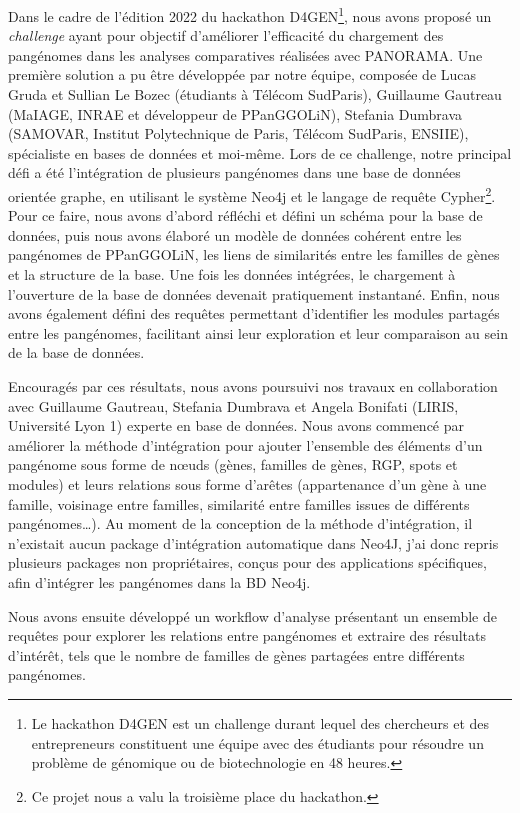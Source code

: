 Dans le cadre de l’édition 2022 du hackathon D4GEN\footnote{Le hackathon D4GEN est un challenge durant lequel des chercheurs et des entrepreneurs constituent une équipe avec des étudiants pour résoudre un problème de génomique ou de biotechnologie en 48 heures.}, nous avons proposé un \textit{challenge} ayant pour objectif d’améliorer l’efficacité du chargement des pangénomes dans les analyses comparatives réalisées avec PANORAMA. Une première solution a pu être développée par notre équipe, composée de Lucas Gruda et Sullian Le Bozec (étudiants à Télécom SudParis), Guillaume Gautreau (MaIAGE, INRAE et développeur de PPanGGOLiN), Stefania Dumbrava (SAMOVAR, Institut Polytechnique de Paris, Télécom SudParis, ENSIIE), spécialiste en bases de données et moi-même. Lors de ce challenge, notre principal défi a été l’intégration de plusieurs pangénomes dans une base de données orientée graphe, en utilisant le système Neo4j et le langage de requête Cypher\footnote{Ce projet nous a valu la troisième place du hackathon.}. Pour ce faire, nous avons d’abord réfléchi et défini un schéma pour la base de données, puis nous avons élaboré un modèle de données cohérent entre les pangénomes de PPanGGOLiN, les liens de similarités entre les familles de gènes et la structure de la base. Une fois les données intégrées, le chargement à l’ouverture de la base de données devenait pratiquement instantané. Enfin, nous avons également défini des requêtes permettant d’identifier les modules partagés entre les pangénomes, facilitant ainsi leur exploration et leur comparaison au sein de la base de données.

Encouragés par ces résultats, nous avons poursuivi nos travaux en collaboration avec Guillaume Gautreau, Stefania Dumbrava et Angela Bonifati (LIRIS, Université Lyon 1) experte en base de données. Nous avons commencé par améliorer la méthode d’intégration pour ajouter l’ensemble des éléments d’un pangénome sous forme de n\oe uds (gènes, familles de gènes, RGP, spots et modules) et leurs relations sous forme d’arêtes (appartenance d’un gène à une famille, voisinage entre familles, similarité entre familles issues de différents pangénomes\dots). Au moment de la conception de la méthode d'intégration, il n'existait aucun package d'intégration automatique dans Neo4J, j'ai donc repris plusieurs packages non propriétaires, conçus pour des applications spécifiques, afin d'intégrer les pangénomes dans la BD Neo4j. 

Nous avons ensuite développé un workflow d’analyse présentant un ensemble de requêtes pour explorer les relations entre pangénomes et extraire des résultats d’intérêt, tels que le nombre de familles de gènes partagées entre différents pangénomes.

